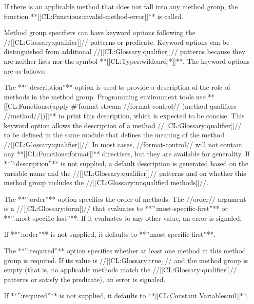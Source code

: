 If there is an applicable method that does not fall into any method group, the function **[[CL:Functions:invalid-method-error]]** is called.

Method group specifiers can have keyword options following the //[[CL:Glossary:qualifier]]// patterns or predicate. Keyword options can be distinguished from additional //[[CL:Glossary:qualifier]]// patterns because they are neither lists nor the symbol **[[CL:Types:wildcard|*]]**. The keyword options are as follows:

\beginlist

\itemitem{\bull} The **'':description''** option is used to provide a description of the role of methods in the method group. Programming environment tools use **[[CL:Functions:(apply #'format stream //format-control// (method-qualifiers //method//))]]** to print this description, which is expected to be concise. This keyword option allows the description of a method //[[CL:Glossary:qualifier]]// to be defined in the same module that defines the meaning of the method //[[CL:Glossary:qualifier]]//. In most cases, //format-control// will not contain any **[[CL:Functions:format]]** directives, but they are available for generality. If **'':description''** is not supplied, a default description is generated based on the variable name and the //[[CL:Glossary:qualifier]]// patterns and on whether this method group includes the //[[CL:Glossary:unqualified methods]]//.

\itemitem{\bull} The **'':order''** option specifies the order of methods. The //order// argument is a //[[CL:Glossary:form]]// that evaluates to **'':most-specific-first''** or **'':most-specific-last''**. If it evaluates to any other value, an error is signaled.

If **'':order''** is not supplied, it defaults to **'':most-specific-first''**.

\itemitem{\bull} The **'':required''** option specifies whether at least one method in this method group is required. If its value is //[[CL:Glossary:true]]// and the method group is empty (that is, no applicable methods match the //[[CL:Glossary:qualifier]]// patterns or satisfy the predicate), an error is signaled.

If **'':required''** is not supplied, it defaults to **[[CL:Constant Variables:nil]]**.

\endlist


